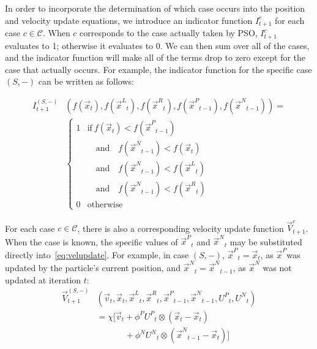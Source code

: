 \documentclass[smallcondensed]{svjour3}
\providecommand{\pers}{\ensuremath{P}}
\providecommand{\neigh}{\ensuremath{N}}
\providecommand{\leftind}{\ensuremath{L}}
\providecommand{\rightind}{\ensuremath{R}}
\providecommand{\nURand}{\ensuremath{U^\neigh}}
\providecommand{\pURand}{\ensuremath{U^\pers}}
\providecommand{\ppos}{\ensuremath{\Vec{x}}}
\providecommand{\pvel}{\ensuremath{\Vec{v}}}
\providecommand{\nbest}{\ensuremath{\Vec{x}^\neigh}}
\providecommand{\pbest}{\ensuremath{\Vec{x}^\pers}}
\providecommand{\constriction}{\ensuremath{\chi}}
\providecommand{\ncoeff}{\ensuremath{\phi^\neigh}}
\providecommand{\pcoeff}{\ensuremath{\phi^\pers}}
\providecommand{\ofunc}{\ensuremath{f}}
\providecommand{\indic}{\ensuremath{I}}
\providecommand{\specvel}{\ensuremath{\vec{V}}}
\providecommand{\leftn}{\ensuremath{\Vec{x}^\leftind}}
\providecommand{\rightn}{\ensuremath{\Vec{x}^\rightind}}
\providecommand{\caseset}{\ensuremath{\mathcal{C}}}
\providecommand{\casegen}{\ensuremath{c}}
\providecommand{\casexn}{\ensuremath{(S,-)}}
\begin{document}
In order to incorporate the determination of which case occurs into the
position and velocity update equations, we introduce an indicator function
$\indic_{t+1}^{\casegen}$ for each case $\casegen \in \caseset$.  When
$\casegen$ corresponds to the case actually taken by PSO,
$\indic_{t+1}^{\casegen}$ evaluates to 1; otherwise it evaluates to 0.  We can
then sum over all of the cases, and the indicator function will make all of the
terms drop to zero except for the case that actually occurs.  For example, the
indicator function for the specific case $\casexn$ can be written as follows:

\begin{align}
  \nonumber
	\indic_{t+1}^{\casexn} & (\ofunc ( \ppos_{t} ) ,\ofunc(\leftn_{t}),
	\ofunc(\rightn_{t}) ,\ofunc(\pbest_{t-1}) ,\ofunc(\nbest_{t-1}))= \\
  \label{eq:deficasexn}
	&\begin{cases}
	   1 & \text{if} \ \ofunc(\ppos_{t}) < \ofunc(\pbest_{t-1}) \\
	   &\quad \text{and} \quad \ofunc(\nbest_{t-1}) < \ofunc(\ppos_{t}) \\
	   &\quad \text{and} \quad \ofunc(\nbest_{t-1}) < \ofunc(\leftn_{t}) \\
	   &\quad \text{and} \quad \ofunc(\nbest_{t-1}) < \ofunc(\rightn_{t}) \\
	   0 & \text{otherwise}
	\end{cases}
\end{align}

For each case $\casegen \in \caseset$, there is also a corresponding
velocity update function $\specvel_{t+1}^{\casegen}$.  When the case is
known, the specific values of $\pbest_t$ and $\nbest_t$ may be substituted
directly into~\eqref{eq:velupdate}.  For example, in case $\casexn$,
$\pbest_{t}=\ppos_{t}$, as \pbest was updated by the particle's current
position, and $\nbest_{t}=\nbest_{t-1}$, as $\nbest$ was not updated at
iteration $t$:
\begin{align}
\nonumber
	\specvel_{t+1}^{\casexn} & (\pvel_t, \ppos_{t}, \leftn_{t}, \rightn_{t},
	\pbest_{t-1}, \nbest_{t-1}, \pURand_{t}, \nURand_{t}) \\
\nonumber
		&= \constriction \bigl[ \pvel_{t} +
			\pcoeff\pURand_{t}\otimes(\ppos_{t} - \ppos_{t}) \\
\label{eq:defvcasexn}
			& \quad \quad \quad \; + \ncoeff\nURand_{t}\otimes(\nbest_{t-1} -
			\ppos_{t}) \bigr]
\end{align}
\end{document}
